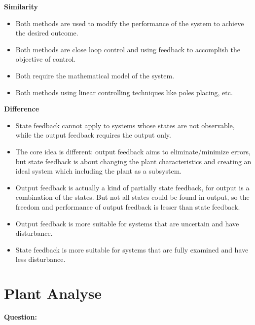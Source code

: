 \documentclass[12pt, oneside]{article}
\begin{document}
\textbf{Similarity}
\begin{itemize}
    \item Both methods are used to modify the performance of the system to achieve the desired outcome.
    \item Both methods are close loop control and using feedback to accomplish the objective of control.
    \item Both require the mathematical model of the system.
    \item Both methods using linear controlling techniques like poles placing, etc.
\end{itemize}

\textbf{Difference}
\begin{itemize}
    \item State feedback cannot apply to systems whose states are not observable, while the output feedback requires the output only.
    \item The core idea is different: output feedback aims to eliminate/minimize errors, but state feedback is about changing the plant characteristics and creating an ideal system which including the plant as a subsystem.
    \item Output feedback is actually a kind of partially state feedback, for output is a combination of the states. But not all states could be found in output, so the freedom and performance of output feedback is lesser than state feedback.
    \item Output feedback is more suitable for systems that are uncertain and have disturbance.
    \item State feedback is more suitable for systems that are fully examined and have less disturbance.
\end{itemize}



\section{Plant Analyse}
\label{section:plant analyse}
\textbf{Question:}
\end{document}

